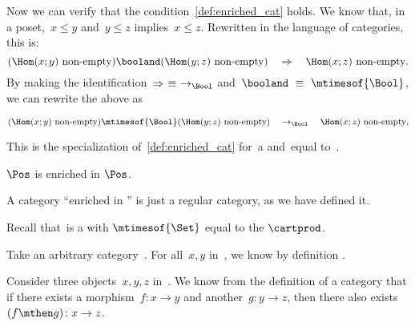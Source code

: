 {\begin{example}
        Now we can verify that the condition~\cref{def:enriched_cat} holds.
        We know that, in a poset,~$x \leq y$ and~$y \leq z$ implies~$x \leq z$.
        Rewritten in the language of categories, this is:
        \begin{equation}
            (\Hom(x;y)\ \text{non-empty})
            \booland
            (\Hom(y; z)\ \text{non-empty})
            \quad
            \Rightarrow
            \quad
            \Hom(x; z)\ \text{non-empty}.
        \end{equation}
        By making the identification~$\Rightarrow\ \equiv\ \to_{\Bool}$ and~$\booland\ \equiv\ \mtimesof{\Bool}$, we can rewrite the above as
        \begin{widepar}
            \begin{equation}
                (\Hom(x;y)\ \text{non-empty})
                \mtimesof{\Bool}
                (\Hom(y; z)\ \text{non-empty})
                \quad
                \to_{\Bool}
                \quad
                \Hom(x; z)\ \text{non-empty},
            \end{equation}
        \end{widepar}
        This is the specialization of~\cref{def:enriched_cat} for~\CatC a  and~\CatD equal to~\Bool.
    \end{example}
    \begin{example}
        $\Pos$ is enriched in $\Pos$.
    \end{example}

    \begin{example}
    \end{example}

    \begin{example}
        A category ``enriched in \Set'' is just a regular category, as we have defined it.

        Recall that~\Set is a  with $\mtimesof{\Set}$ equal to the  $\cartprod$.

        Take an arbitrary category~\CatC.
        For all~$x, y$ in~\CatC, we know by definition .

        Consider three objects~$x,y,z$ in~\CatC.
        We know from the definition of a category that if there exists a morphism~$f: x \to y$ and another~$g: y \to z$, then there also exists~$(f\mthen g)\colon x \to z$.


\end{example}}
